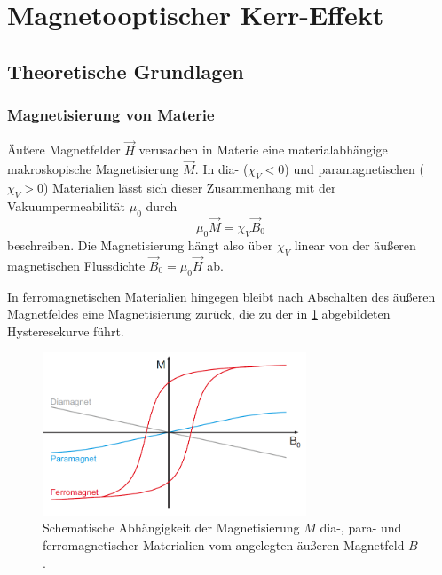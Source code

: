 \section{Magnetooptischer Kerr-Effekt}

\subsection{Theoretische Grundlagen}

  \subsubsection{Magnetisierung von Materie}

  Äußere Magnetfelder $\vec{H}$ verusachen in Materie eine materialabhängige makroskopische Magnetisierung $\vec{M}$.
  In dia- ($\chi_V<0$) und paramagnetischen ($\chi_V>0$) Materialien lässt sich dieser Zusammenhang mit der Vakuumpermeabilität $\mu_0$ durch
  \begin{equation}
    \mu_0 \vec{M} = \chi_V \vec{B}_0
  \end{equation}
  beschreiben.
  Die Magnetisierung hängt also über $\chi_V$ linear von der äußeren magnetischen Flussdichte $\vec{B}_0= \mu_0 \vec{H}$ ab.

  In ferromagnetischen Materialien hingegen bleibt nach Abschalten des äußeren Magnetfeldes eine Magnetisierung zurück, die zu der in \cref{fig_magnetismen} abgebildeten Hysteresekurve führt.

  \begin{figure}[H]
      \centering
      \includegraphics[width=0.7\textwidth]{img/magnetismen}
      \caption{Schematische Abhängigkeit der Magnetisierung $M$ dia-, para- und ferromagnetischer Materialien vom angelegten äußeren Magnetfeld $B$. \cite{anleitung}}
      \label{fig_magnetismen}
  \end{figure}


